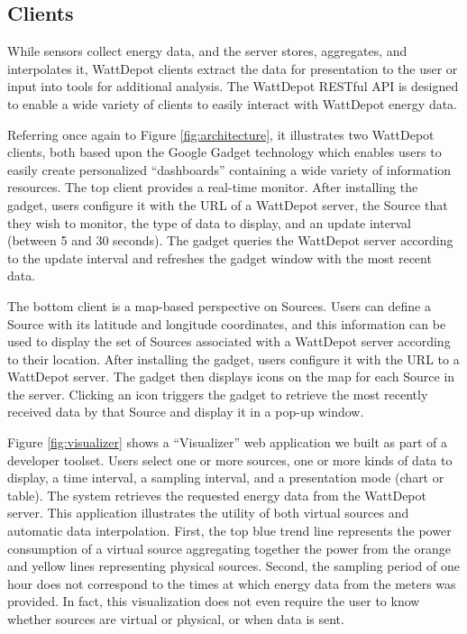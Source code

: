 \documentclass[conference,compsoc]{IEEEtran}
\begin{document}
\subsection{Clients}

While sensors collect energy data, and the server stores, aggregates, and
interpolates it, WattDepot clients extract the data for presentation to the
user or input into tools for additional analysis.  The WattDepot RESTful
API is designed to enable a wide variety of clients to easily interact with
WattDepot energy data.  

Referring once again to Figure \ref{fig:architecture}, it illustrates two
WattDepot clients, both based upon the Google Gadget technology which
enables users to easily create personalized ``dashboards'' containing a
wide variety of information resources.  The top client provides a real-time
monitor.  After installing the gadget, users configure it with the URL of a
WattDepot server, the Source that they wish to monitor, the type of data to
display, and an update interval (between 5 and 30 seconds).  The gadget
queries the WattDepot server according to the update interval and refreshes
the gadget window with the most recent data.

The bottom client is a map-based perspective on Sources.  Users can define
a Source with its latitude and longitude coordinates, and this information
can be used to display the set of Sources associated with a WattDepot
server according to their location.  After installing the gadget, users
configure it with the URL to a WattDepot server.  The gadget then displays
icons on the map for each Source in the server.  Clicking an icon triggers
the gadget to retrieve the most recently received data by that Source and
display it in a pop-up window.

Figure \ref{fig:visualizer} shows a ``Visualizer'' web application we built
as part of a developer toolset.  Users select one or more sources, one or
more kinds of data to display, a time interval, a sampling interval, and a
presentation mode (chart or table).  The system retrieves the requested
energy data from the WattDepot server.  This application illustrates the
utility of both virtual sources and automatic data interpolation. First,
the top blue trend line represents the power consumption of a virtual
source aggregating together the power from the orange and yellow lines
representing physical sources. Second, the sampling period of one hour does
not correspond to the times at which energy data from the meters was
provided.  In fact, this visualization does not even require the user to
know whether sources are virtual or physical, or when data is sent.
\end{document}
